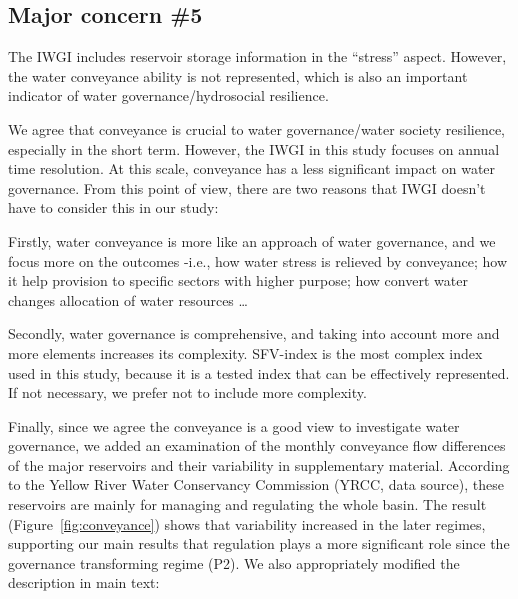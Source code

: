 \subsection{Major concern \#5}
\RC{} The IWGI includes reservoir storage information in the ``stress'' aspect. However, the water conveyance ability is not represented, which is also an important indicator of water governance/hydrosocial resilience.

\AR{} We agree that conveyance is crucial to water governance/water society resilience, especially in the short term. However, the IWGI in this study focuses on annual time resolution. At this scale, conveyance has a less significant impact on water governance. From this point of view, there are two reasons that IWGI doesn't have to consider this in our study:

\AR*{} Firstly, water conveyance is more like an approach of water governance, and we focus more on the outcomes -i.e., how water stress is relieved by conveyance; how it help provision to specific sectors with higher purpose; how convert water changes allocation of water resources \dots

\AR*{} Secondly, water governance is comprehensive, and taking into account more and more elements increases its complexity. SFV-index is the most complex index used in this study, because it is a tested index that can be effectively represented. If not necessary, we prefer not to include more complexity.

\AR*{} Finally, since we agree the conveyance is a good view to investigate water governance, we added an examination of the monthly conveyance flow differences of the major reservoirs and their variability in supplementary material. According to the Yellow River Water Conservancy Commission (YRCC, data source), these reservoirs are mainly for managing and regulating the whole basin. The result (Figure~\ref{fig:conveyance}) shows that variability increased in the later regimes, supporting our main results that regulation plays a more significant role since the governance transforming regime (P2). We also appropriately modified the description in main text:

